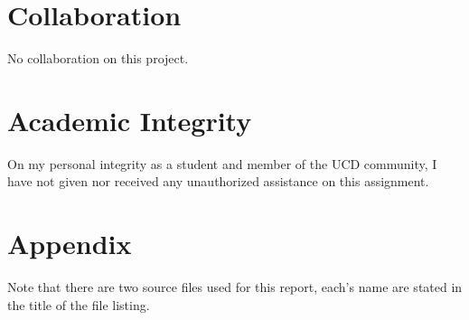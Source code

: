 \documentclass[a4paper,12pt]{article}
\begin{document}
\section{Collaboration}
No collaboration on this project.


\section{Academic Integrity}
On my personal integrity as a student and member of the UCD community, I have not given nor received any unauthorized assistance on this assignment.


\section{Appendix}
Note that there are two source files used for this report,
each's name are stated in the title of the file listing.


\end{document}
